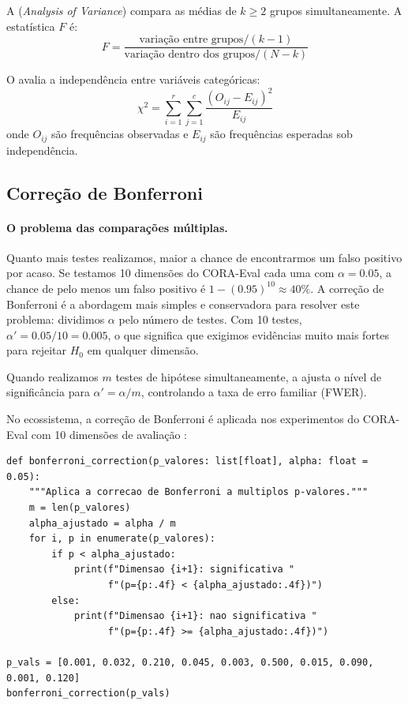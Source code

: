 \begin{definicao}[ANOVA]
    A  (\textit{Analysis of Variance}) compara as médias de
    $k \geq 2$ grupos simultaneamente. A estatística $F$ é:
    \[
    F = \frac{\text{variação entre grupos} / (k-1)}
    {\text{variação dentro dos grupos} / (N - k)}
    \]
\end{definicao}

\begin{definicao}
    O  avalia a independência entre variáveis
    categóricas:
    \[
    \chi^2 = \sum_{i=1}^{r} \sum_{j=1}^{c}
    \frac{(O_{ij} - E_{ij})^2}{E_{ij}}
    \]
    onde $O_{ij}$ são frequências observadas e $E_{ij}$ são frequências
    esperadas sob independência.
\end{definicao}

\subsection{Correção de Bonferroni}

\paragraph{O problema das comparações múltiplas.} Quanto mais testes
realizamos, maior a chance de encontrarmos um falso positivo por acaso.
Se testamos 10 dimensões do CORA-Eval cada uma com $\alpha = 0.05$, a chance
de pelo menos um falso positivo é $1 - (0.95)^{10} \approx 40\%$. A correção
de Bonferroni é a abordagem mais simples e conservadora para resolver este
problema: dividimos $\alpha$ pelo número de testes. Com 10 testes,
$\alpha' = 0.05 / 10 = 0.005$, o que significa que exigimos evidências muito
mais fortes para rejeitar $H_0$ em qualquer dimensão.

\begin{definicao}
    Quando realizamos $m$ testes de hipótese simultaneamente, a
     ajusta o nível de significância para
    $\alpha' = \alpha / m$, controlando a taxa de erro familiar (FWER).
\end{definicao}

\begin{exemplo}
    No ecossistema, a correção de Bonferroni é aplicada nos experimentos
    do CORA-Eval com 10 dimensões de avaliação \cite{laranjeira2026cora}:
    \begin{lstlisting}[style=pythonstyle]
def bonferroni_correction(p_valores: list[float], alpha: float = 0.05):
    """Aplica a correcao de Bonferroni a multiplos p-valores."""
    m = len(p_valores)
    alpha_ajustado = alpha / m
    for i, p in enumerate(p_valores):
        if p < alpha_ajustado:
            print(f"Dimensao {i+1}: significativa "
                  f"(p={p:.4f} < {alpha_ajustado:.4f})")
        else:
            print(f"Dimensao {i+1}: nao significativa "
                  f"(p={p:.4f} >= {alpha_ajustado:.4f})")

p_vals = [0.001, 0.032, 0.210, 0.045, 0.003, 0.500, 0.015, 0.090, 0.001, 0.120]
bonferroni_correction(p_vals)
    \end{lstlisting}
\end{exemplo}

